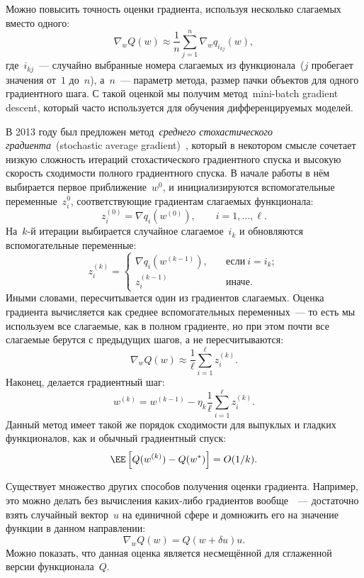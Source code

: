 \documentclass[12pt,fleqn]{article}
\begin{document}
Можно повысить точность оценки градиента, используя несколько слагаемых вместо одного:
\[
    \nabla_w Q(w)
    \approx
    \frac{1}{n}
    \sum_{j = 1}^{n}
    \nabla_w q_{i_{kj}}(w),
\]
где~$i_{kj}$~--- случайно выбранные номера слагаемых из функционала~($j$ пробегает значения от~$1$ до~$n$),
а~$n$~--- параметр метода, размер пачки объектов для одного градиентного шага.
С такой оценкой мы получим метод~mini-batch gradient descent,
который часто используется для обучения дифференцируемых моделей.

В 2013 году был предложен метод~\emph{среднего стохастического градиента}~(stochastic average gradient)~\cite{schmidt13sag},
который в некотором смысле сочетает низкую сложность итераций стохастического градиентного спуска
и высокую скорость сходимости полного градиентного спуска.
В начале работы в нём выбирается первое приближение~$w^0$,
и инициализируются вспомогательные переменные~$z_i^0$,
соответствующие градиентам слагаемых функционала:
\[
    z_i^{(0)}
    =
    \nabla q_i(w^{(0)}),
    \qquad
    i = 1, \dots, \ell.
\]
На~$k$-й итерации выбирается случайное слагаемое~$i_k$ и
обновляются вспомогательные переменные:
\[
    z_i^{(k)}
    =
    \begin{cases}
        \nabla q_i(w^{(k - 1)}),
        \quad
        &\text{если}\ i = i_k;\\
        z_i^{(k - 1)}
        \quad
        &\text{иначе}.
    \end{cases}
\]
Иными словами, пересчитывается один из градиентов слагаемых.
Оценка градиента вычисляется как среднее вспомогательных переменных~---
то есть мы используем все слагаемые, как в полном градиенте,
но при этом почти все слагаемые берутся с предыдущих шагов, а не пересчитываются:
\[
    \nabla_w Q(w)
    \approx
    \frac{1}{\ell}
    \sum_{i = 1}^{\ell}
        z_i^{(k)}.
\]
Наконец, делается градиентный шаг:
\[
    w^{(k)}
    =
    w^{(k - 1)}
    -
    \eta_k
    \frac{1}{\ell}
    \sum_{i = 1}^{\ell}
    z_i^{(k)}.
\]
Данный метод имеет такой же порядок сходимости для выпуклых и гладких функционалов,
как и обычный градиентный спуск:
\[
    \EE \left[
        Q(w^{(k)}) - Q(w^*)
    \right]
    =
    O(1 / k).
\]

Существует множество других способов получения оценки градиента.
Например, это можно делать без вычисления каких-либо градиентов вообще~\cite{flaxman05without}~---
достаточно взять случайный вектор~$u$ на единичной сфере и домножить его
на значение функции в данном направлении:
\[
    \nabla_w Q(w)
    =
    Q(w + \delta u) u.
\]
Можно показать, что данная оценка является несмещённой для сглаженной версии функционала~$Q$.
\end{document}
